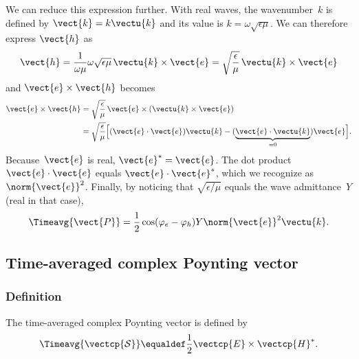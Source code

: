 \begin{refsection}
We can reduce this expression further.
With real waves, the wavenumber~$k$ is defined by $\vect{k} = k \vectu{k}$ and its value is $k=\omega \sqrt{\epsilon \mu}$.
We can therefore express $\vect{h}$ as
\begin{equation}
    \vect{h}
    = \frac{1}{\omega \mu} \omega \sqrt{\epsilon \mu} \, \vectu{k} \times \vect{e}
    = \sqrt{\frac{\epsilon}{\mu}} \, \vectu{k} \times \vect{e}
\end{equation}
and $\vect{e} \times \vect{h}$ becomes
\begin{subequations}
    \begin{align}
        \vect{e} \times \vect{h}
        &=
        \sqrt{\frac{\epsilon}{\mu}} \, \vect{e} \times (\vectu{k} \times \vect{e})
        \\
        &=
        \sqrt{\frac{\epsilon}{\mu}}
        \Big[
            (\vect{e} \cdot \vect{e})\vectu{k}
            -
            (
                \underbrace{\vect{e} \cdot \vectu{k}}_{=0}
            )\vect{e}
        \Big]
        \text{.}
    \end{align}
\end{subequations}
Because~$\vect{e}$ is real, $\vect{e}^*=\vect{e}$.
The dot product $\vect{e}\cdot\vect{e}$ equals $\vect{e}\cdot\vect{e}^*$, which we recognize as~$\norm{\vect{e}}^2$.
Finally, by noticing that $\sqrt{\epsilon/\mu}$ equals the wave admittance~$Y$ (real in that case),
\begin{equation}
    \Timeavg{\vect{P}}
    =
    \frac{1}{2} \cos(\varphi_e - \varphi_h) 
    Y %
    \norm{\vect{e}}^2
    \vectu{k}
    \text{.}
    \label{eq:poynting_real}
\end{equation}





\subsection{Time-averaged complex Poynting vector}
\label{sec:time_averaged_complex_poynting_vector}




\subsubsection{Definition}
The time-averaged complex Poynting vector is defined by
\begin{equation}
    \Timeavg{\vectcp{\mathcal{S}}}
    \equaldef
    \frac{1}{2} \vectcp{E} \times \vectcp{H}^*
    \text{.}
    \label{eq:poynting_complex_def}
\end{equation}




\end{refsection}
